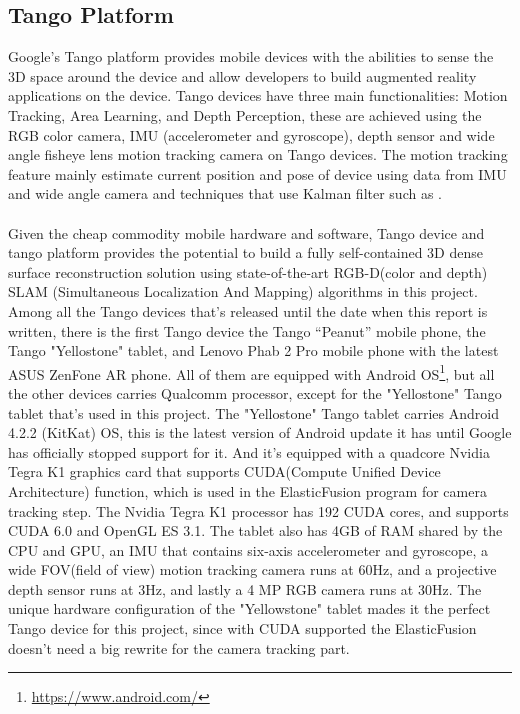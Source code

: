 \documentclass[12pt,twoside]{article}
\begin{document}
\subsection{Tango Platform}
Google's Tango\citep{tango} platform provides mobile devices with the abilities to sense the 3D space around the device and allow developers to build augmented reality applications on the device. Tango devices have three main functionalities: Motion Tracking, Area Learning, and Depth Perception, these are achieved using the RGB color camera, IMU (accelerometer and gyroscope), depth sensor and wide angle fisheye lens motion tracking camera on Tango devices. The motion tracking feature mainly estimate current position and pose of device using data from IMU and wide angle camera and techniques that use Kalman filter such as \citep{mourikis2007multi}. \\
\\
Given the cheap commodity mobile hardware and software, Tango device and tango platform provides the potential to build a fully self-contained 3D dense surface reconstruction solution using state-of-the-art RGB-D(color and depth) SLAM (Simultaneous Localization And Mapping) algorithms in this project. Among all the Tango devices that's released until the date when this report is written, there is the first Tango device the Tango “Peanut” mobile phone, the Tango "Yellostone" tablet, and Lenovo Phab 2 Pro mobile phone with the latest ASUS ZenFone AR phone. All of them are equipped with Android OS\footnote{\url{https://www.android.com/}}, but all the other devices carries Qualcomm processor, except for the "Yellostone" Tango tablet that's used in this project. The "Yellostone" Tango tablet carries Android 4.2.2 (KitKat) OS, this is the latest version of Android update it has until Google has officially stopped support for it. And it's equipped with a quadcore Nvidia Tegra K1 graphics card that supports CUDA(Compute Unified Device Architecture) function, which is used in the ElasticFusion program for camera tracking step. The Nvidia Tegra K1 processor has 192 CUDA cores, and supports CUDA 6.0 and OpenGL ES 3.1. The tablet also has 4GB of RAM shared by the CPU and GPU, an IMU that contains six-axis accelerometer and gyroscope, a wide FOV(field of view) motion tracking camera runs at 60Hz, and a projective depth sensor runs at 3Hz, and lastly a 4 MP RGB camera runs at 30Hz. The unique hardware configuration of the "Yellowstone" tablet mades it the perfect Tango device for this project, since with CUDA supported the ElasticFusion doesn't need a big rewrite for the camera tracking part.\\
\end{document}

